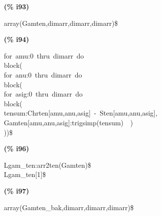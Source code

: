 \documentclass[fleqn]{article}
\begin{document}
\noindent
\begin{minipage}[t]{4.000000em}\color{red}\bfseries
(\% i93)	
\end{minipage}
\begin{minipage}[t]{\textwidth}\color{blue}
array(Gamten,dimarr,dimarr,dimarr)\$
\end{minipage}

\noindent%



\noindent
\begin{minipage}[t]{4.000000em}\color{red}\bfseries
(\% i94)	
\end{minipage}
\begin{minipage}[t]{\textwidth}\color{blue}
for\ amu:0\ thru\ dimarr\ do\\
block(\\
for\ anu:0\ thru\ dimarr\ do\\
block(\\
for\ asig:0\ thru\ dimarr\ do\\
block(\\
tensum:Chrten[amu,anu,asig]\ -\ Sten[amu,anu,asig],\\
Gamten[amu,anu,asig]:trigsimp(tensum)\ \ )\\
))\$
\end{minipage}

\noindent%



\noindent
\begin{minipage}[t]{4.000000em}\color{red}\bfseries
(\% i96)	
\end{minipage}
\begin{minipage}[t]{\textwidth}\color{blue}
Lgam\_ten:arr2ten(Gamten)\$\\
Lgam\_ten[1]\$
\end{minipage}

\noindent%



\noindent
\begin{minipage}[t]{4.000000em}\color{red}\bfseries
(\% i97)	
\end{minipage}
\begin{minipage}[t]{\textwidth}\color{blue}
array(Gamten\_bak,dimarr,dimarr,dimarr)\$
\end{minipage}

\noindent%
\end{document}
